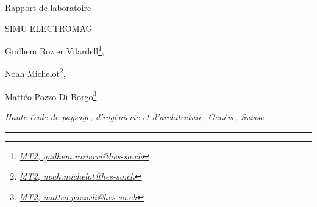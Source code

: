 \documentclass[a4paper,10pt]{article}
\begin{document}
\begin{center}
\vspace*{0mm}

\large
Rapport de laboratoire\\
\vspace{3mm}

SIMU ELECTROMAG\\
\vspace{8mm}

Guilhem Rozier Vilardell\footnote{\textit{\href{mailto:guilhem.roziervi@hes-so.ch}{MT2, guilhem.roziervi@hes-so.ch}}},

Noah Michelot\footnote{\textit{\href{mailto:noah.michelot@hes-so.ch}{MT2, noah.michelot@hes-so.ch}}},

Mattéo Pozzo Di Borgo\footnote{\textit{\href{mailto:matteo.pozzodi@hes-so.ch}{MT2, matteo.pozzodi@hes-so.ch}}}

\vspace{3mm}

\footnotesize{
\textit{Haute école de paysage, d'ingénierie et d'architecture, Genève, Suisse}
}\\

\vspace{9mm}
\end{center}

\rule{\linewidth}{0.4pt}

\onehalfspacing

\end{document}

